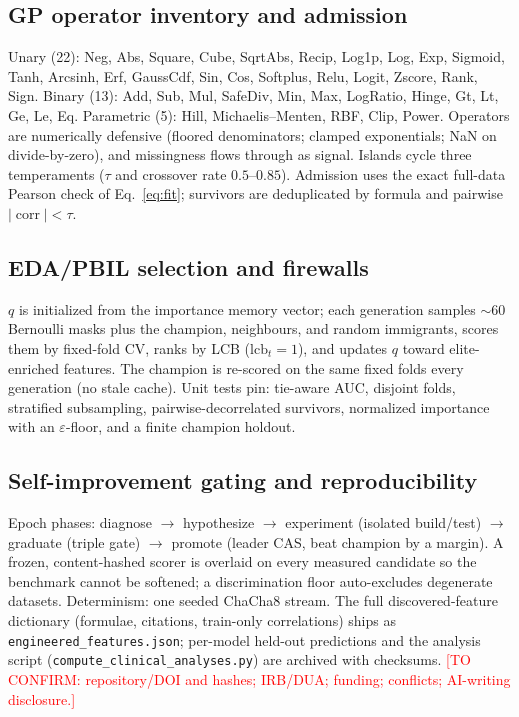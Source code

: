 \documentclass[10pt,conference]{IEEEtran}
\newcommand{\confirm}[1]{\textcolor{red}{[TO CONFIRM: #1]}}
\providecommand{\corr}{\operatorname{corr}}
\begin{document}
\appendix
\subsection{GP operator inventory and admission}
Unary (22): Neg, Abs, Square, Cube, SqrtAbs, Recip, Log1p, Log, Exp, Sigmoid, Tanh, Arcsinh, Erf,
GaussCdf, Sin, Cos, Softplus, Relu, Logit, Zscore, Rank, Sign. Binary (13): Add, Sub, Mul, SafeDiv,
Min, Max, LogRatio, Hinge, Gt, Lt, Ge, Le, Eq. Parametric (5): Hill, Michaelis--Menten, RBF, Clip,
Power. Operators are numerically defensive (floored denominators; clamped exponentials; NaN on
divide-by-zero), and missingness flows through as signal. Islands cycle three temperaments
($\tau$ and crossover rate $0.5$--$0.85$). Admission uses the exact full-data Pearson check of
Eq.~\eqref{eq:fit}; survivors are deduplicated by formula and pairwise $|\corr|<\tau$.

\subsection{EDA/PBIL selection and firewalls}
$q$ is initialized from the importance memory vector; each generation samples $\sim$60 Bernoulli
masks plus the champion, neighbours, and random immigrants, scores them by fixed-fold CV, ranks by
LCB ($\mathrm{lcb}_t=1$), and updates $q$ toward elite-enriched features. The champion is re-scored
on the same fixed folds every generation (no stale cache). Unit tests pin: tie-aware AUC, disjoint
folds, stratified subsampling, pairwise-decorrelated survivors, normalized importance with an
$\varepsilon$-floor, and a finite champion holdout.

\subsection{Self-improvement gating and reproducibility}
Epoch phases: diagnose $\rightarrow$ hypothesize $\rightarrow$ experiment (isolated build/test)
$\rightarrow$ graduate (triple gate) $\rightarrow$ promote (leader CAS, beat champion by a margin).
A frozen, content-hashed scorer is overlaid on every measured candidate so the benchmark cannot be
softened; a discrimination floor auto-excludes degenerate datasets. Determinism: one seeded ChaCha8
stream. The full discovered-feature dictionary (formulae, citations, train-only correlations) ships
as \texttt{engineered\_features.json}; per-model held-out predictions and the analysis script
(\texttt{compute\_clinical\_analyses.py}) are archived with checksums. \confirm{repository/DOI and
hashes; IRB/DUA; funding; conflicts; AI-writing disclosure.}



\end{document}
